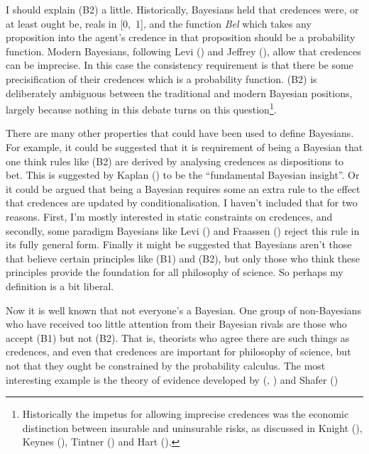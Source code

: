 \documentclass[
  11pt,
  letterpaper,
  DIV=11,
  numbers=noendperiod,
  twoside]{scrartcl}
\begin{document}
I should explain (B2) a little. Historically, Bayesians held that
credences were, or at least ought be, reals in {[}0,~1{]}, and the
function \emph{Bel} which takes any proposition into the agent's
credence in that proposition should be a probability function. Modern
Bayesians, following Levi () and Jeffrey
(), allow that credences can be
imprecise. In this case the consistency requirement is that there be
some precisification of their credences which is a probability function.
(B2) is deliberately ambiguous between the traditional and modern
Bayesian positions, largely because nothing in this debate turns on this
question\footnote{Historically the impetus for allowing imprecise
  credences was the economic distinction between insurable and
  uninsurable risks, as discussed in Knight
  (), Keynes
  (), Tintner
  () and Hart
  ().}.

There are many other properties that could have been used to define
Bayesians. For example, it could be suggested that it is requirement of
being a Bayesian that one think rules like (B2) are derived by analysing
credences as dispositions to bet. This is suggested by Kaplan
() to be the ``fundamental Bayesian
insight''. Or it could be argued that being a Bayesian requires some an
extra rule to the effect that credences are updated by
conditionalisation. I haven't included that for two reasons. First, I'm
mostly interested in static constraints on credences, and secondly, some
paradigm Bayesians like Levi () and
Fraassen () reject this rule in its
fully general form. Finally it might be suggested that Bayesians aren't
those that believe certain principles like (B1) and (B2), but only those
who think these principles provide the foundation for all philosophy of
science. So perhaps my definition is a bit liberal.

Now it is well known that not everyone's a Bayesian. One group of
non-Bayesians who have received too little attention from their Bayesian
rivals are those who accept (B1) but not (B2). That is, theorists who
agree there are such things as credences, and even that credences are
important for philosophy of science, but not that they ought be
constrained by the probability calculus. The most interesting example is
the theory of evidence developed by
(,
) and Shafer
()
\end{document}
